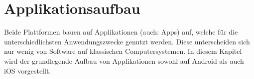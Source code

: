 \section{Applikationsaufbau}
	Beide Plattformen bauen auf Applikationen (auch: Apps) auf, welche für die
	unterschiedlichsten Anwendungszwecke genutzt werden. Diese unterscheiden sich
	nur wenig von Software auf klassischen Computersystemen. In diesem
	Kapitel wird der grundlegende Aufbau von Applikationen sowohl auf Android als
	auch iOS vorgestellt.
